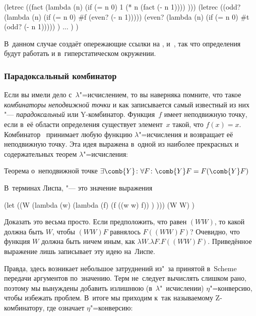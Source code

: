 \begin{code:lisp}
(letrec ((fact (lambda (n)
                 (if (= n 0) 1 (* n (fact (- n 1)))) )))
  (letrec ((odd? (lambda (n) (if (= n 0) #f (even? (- n 1)))))
           (even? (lambda (n) (if (= n 0) #t (odd? (- n 1))))) )
    ... ) )
\end{code:lisp}

\noindent
В~данном случае  создаёт опережающие ссылки на , 
и~, так что определения будут работать и в~гиперстатическом окружении.


\subsubsection{Парадоксальный комбинатор}

Если вы имели дело с~$\lambda$"=исчислением, то вы наверняка помните, что
такое \emph{комбинаторы неподвижной точки} и как записывается самый известный
из них "--- \emph{парадоксальный} или Y-комбинатор. Функция~$f$ имеет
неподвижную точку, если в~её области определения существует элемент~$x$ такой,
что $f(x) = x$. Комбинатор~ принимает любую функцию
$\lambda$"=исчисления и возвращает её неподвижную точку. Эта идея выражена
в~одной из наиболее прекрасных и содержательных теорем $\lambda$"=исчисления:

\begin{theorem}{Теорема о~неподвижной точке}
$\exists \comb{Y}\colon \forall F\colon \comb{Y} F = F(\comb{Y} F)$
\end{theorem}

В~терминах Лиспа,  "--- это значение выражения

\begin{code:lisp}
(let ((W (lambda (w)
           (lambda (f)
             (f ((w w) f)) ) )))
  (W W) )
\end{code:lisp}

Доказать это весьма просто. Если предположить, что  равен $(W W)$,
то какой должна быть $W$\!, чтобы $(W W)F$ равнялось $F ((W W) F)$?
Очевидно, что функция $W$\! должна быть ничем иным, как $\lambda W. \lambda F.
F ((W W) F)$. Приведённое выражение лишь записывает эту идею на~Лиспе.

Правда, здесь возникает небольшое затруднений из"~за принятой в~Scheme передачи
аргументов по~значению. Терм  не~следует вычислять слишком рано,
поэтому мы вынуждены добавить излишнюю (в~$\lambda$"~исчислении)
$\eta$"=конверсию, чтобы избежать проблем. В~итоге мы приходим к~так называемому
Z-комбинатору, где  означает $\eta$"=конверсию:

